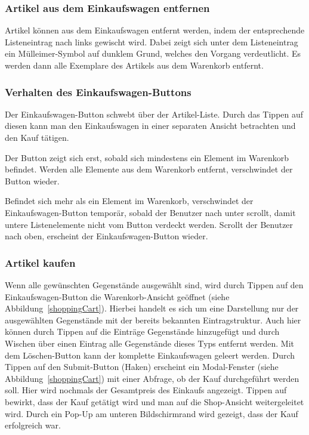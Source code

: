 \subsubsection{Artikel aus dem Einkaufswagen entfernen} \label{subsubsec:shoppingcart-del-item}

Artikel können aus dem Einkaufswagen entfernt werden, indem der entsprechende Listeneintrag nach links gewischt wird.
Dabei zeigt sich unter dem Listeneintrag ein Mülleimer-Symbol auf dunklem Grund, welches den Vorgang verdeutlicht.
Es werden dann alle Exemplare des Artikels aus dem Warenkorb entfernt.

\subsubsection{Verhalten des Einkaufswagen-Buttons} \label{subsubsec:shoppingcart-button}

Der Einkaufswagen-Button schwebt über der Artikel-Liste.
Durch das Tippen auf diesen kann man den Einkaufswagen in einer separaten Ansicht betrachten und den Kauf tätigen.

Der Button zeigt sich erst, sobald sich mindestens ein Element im Warenkorb befindet.
Werden alle Elemente aus dem Warenkorb entfernt, verschwindet der Button wieder.

Befindet sich mehr als ein Element im Warenkorb, verschwindet der Einkaufswagen-Button temporär, sobald der Benutzer nach unter scrollt, damit untere Listenelemente nicht vom Button verdeckt werden.
Scrollt der Benutzer nach oben, erscheint der Einkaufswagen-Button wieder.

\subsubsection{Artikel kaufen} \label{subsubsec:shop-buy}

Wenn alle gewünschten Gegenstände ausgewählt sind, wird durch Tippen auf den Einkaufswagen-Button die Warenkorb-Ansicht geöffnet (siehe Abbildung~\ref{shoppingCart}).
Hierbei handelt es sich um eine Darstellung nur der ausgewählten Gegenstände mit der bereits bekannten Eintragstruktur.
Auch hier können durch Tippen auf die Einträge Gegenstände hinzugefügt und durch Wischen über einen Eintrag alle Gegenstände dieses Typs entfernt werden.
Mit dem Löschen-Button kann der komplette Einkaufswagen geleert werden.
Durch Tippen auf den Submit-Button (Haken) erscheint ein Modal-Fenster (siehe Abbildung~\ref{shoppingCart}) mit einer Abfrage, ob der Kauf durchgeführt werden soll.
Hier wird nochmals der Gesamtpreis des Einkaufs angezeigt.
Tippen auf  bewirkt, dass der Kauf getätigt wird und man auf die Shop-Ansicht weitergeleitet wird.
Durch ein Pop-Up am unteren Bildschirmrand wird gezeigt, dass der Kauf erfolgreich war.


